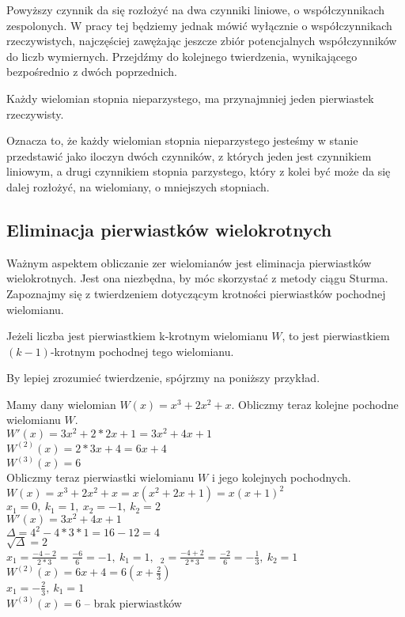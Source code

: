 Powyższy czynnik da się rozłożyć na dwa czynniki liniowe, o współczynnikach zespolonych. W pracy tej będziemy jednak mówić wyłącznie o współczynnikach rzeczywistych, najczęściej zawężając jeszcze zbiór potencjalnych współczynników do liczb wymiernych. Przejdźmy do kolejnego twierdzenia, wynikającego bezpośrednio z dwóch poprzednich.

\begin{theorem}
	$ $\\
	Każdy wielomian stopnia nieparzystego, ma przynajmniej jeden pierwiastek rzeczywisty.
\end{theorem}

Oznacza to, że każdy wielomian stopnia nieparzystego jesteśmy w stanie przedstawić jako iloczyn dwóch czynników, z których jeden jest czynnikiem liniowym, a drugi czynnikiem stopnia parzystego, który z kolei być może da się dalej rozłożyć, na wielomiany, o mniejszych stopniach.

\subsection{Eliminacja pierwiastków wielokrotnych}

Ważnym aspektem obliczanie zer wielomianów jest eliminacja pierwiastków wielokrotnych. Jest ona niezbędna, by móc skorzystać z metody ciągu Sturma. Zapoznajmy się z twierdzeniem dotyczącym krotności pierwiastków pochodnej wielomianu.

\begin{theorem}
	$ $\\
	Jeżeli liczba jest pierwiastkiem k-krotnym wielomianu $W$, to jest pierwiastkiem $(k-1)$-krotnym pochodnej tego wielomianu.
\end{theorem}

By lepiej zrozumieć twierdzenie, spójrzmy na poniższy przykład.

\begin{example}
	$ $\\
	Mamy dany wielomian $W(x) = x^3 + 2x^2 + x$. Obliczmy teraz kolejne pochodne wielomianu $W$. \\
	$W'(x) = 3x^2 + 2*2x + 1 = 3x^2 + 4x + 1 $ \\
	$W^{(2)}(x) = 2*3x + 4 = 6x + 4 $ \\
	$W^{(3)}(x) = 6$ \\
	Obliczmy teraz pierwiastki wielomianu $W$ i jego kolejnych pochodnych. \\
	$W(x) = x^3 + 2x^2 + x = x(x^2 + 2x +1) = x(x + 1)^2$ \\
	$x_1 = 0,\ k_1 = 1,\ x_2 = -1,\ k_2 = 2$ \\
	$W'(x) = 3x^2 + 4x + 1$ \\
	$\Delta = 4^2 - 4*3*1 = 16 - 12 = 4$ \\
	$\sqrt{\Delta} = 2$ \\
	$x_1 = \frac{-4-2}{2*3} = \frac{-6}{6} = -1,\ k_1 = 1,$\ $_2 = \frac{-4+2}{2*3} = \frac{-2}{6} = -\frac{1}{3},\ k_2 = 1$ \\
	$W^{(2)}(x) = 6x + 4 = 6 (x + \frac{2}{3})$ \\
	$x_1 = -\frac{2}{3},\ k_1 = 1$ \\
	$W^{(3)}(x) = 6$ -- brak pierwiastków
\end{example}

